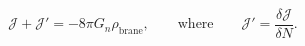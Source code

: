 \begin{equation}
\mathcal{J} + \mathcal{J}'=-8\pi G_n\rho_\textrm{brane},
  \qquad \textrm{where} \qquad
  \mathcal{J}'=\frac{\delta \mathcal{J}}{\delta N}.
\end{equation}


